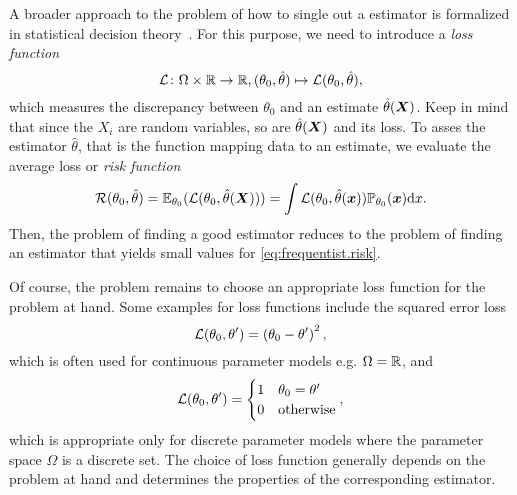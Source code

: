 A broader approach to the problem of how to single out a  estimator is formalized in statistical decision theory~\cite{Casella_2008_Statistical,Lehmann_1998_Theory}.
For this purpose, we need to introduce a \emph{loss function}
\[
  \label{eq:frequentist.loss_function}
  \mathcal{L}\colon \Omega \times \mathbb{R} \to \mathbb{R},  (\theta_0, \hat{\theta}) \mapsto \mathcal{L}(\theta_0, \hat{\theta}),
\]
which measures the discrepancy between $\theta_0$ and an estimate $\hat{\theta}(\boldsymbol{X})$.
Keep in mind that since the $X_i$ are random variables, so are $\hat{\theta}(\boldsymbol{X})$ and its loss.
To asses the estimator $\hat\theta$, that is the function mapping data to an estimate, we evaluate the average loss or \emph{risk function}
\[
  \label{eq:frequentist.risk}
  \mathcal{R}(\theta_0, \hat\theta) = \mathbb{E}_{\theta_0}(\mathcal{L}(\theta_0, \hat\theta(\boldsymbol{X})))
  = \int \mathcal{L}(\theta_0, \hat\theta(\boldsymbol{x})) \mathbb{P}_{\theta_0}(\boldsymbol{x}) \mathrm{d} x.
\]
Then, the problem of finding a good estimator reduces to the problem of finding an estimator that yields small values for \cref{eq:frequentist.risk}.

Of course, the problem remains to choose an appropriate loss function for the problem at hand.
Some examples for loss functions include the squared error loss
\[
  \mathcal{L}(\theta_0, \theta') = \left( \theta_0 - \theta' \right)^2,
  \label{eq:frequentist.l2loss}
\]
which is often used for continuous parameter models e.g. $\Omega = \mathbb{R}$, and
\[
  \mathcal{L}(\theta_0, \theta') =
  \begin{cases}
    1 & \theta_0 = \theta' \\
    0 & \mathrm{otherwise}
  \end{cases},
  \label{eq:frequentist.01loss}
\]
which is appropriate only for discrete parameter models where the parameter space $\Omega$ is a discrete set.
The choice of loss function generally depends on the problem at hand and determines the properties of the corresponding estimator.\\



